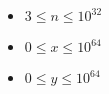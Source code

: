 \begin{itemize}
	\tightlist
	\item $3 \le n \le 10^{32}$
	\item $0 \le x \le 10^{64}$
	\item $0 \le y \le 10^{64}$
\end{itemize}

